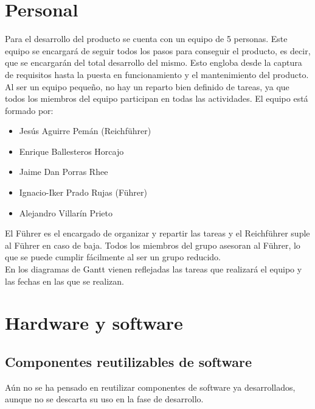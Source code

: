 \documentclass[spanish,a4paper,12pt]{report}	%
\begin{document}
	\section{Personal}
		Para el desarrollo del producto se cuenta con un equipo de 5 personas. Este
		equipo se encargará de seguir todos los pasos para conseguir el producto, es
		decir, que se encargarán del total desarrollo del mismo. Esto engloba desde la
		captura de requisitos hasta la puesta en funcionamiento y el mantenimiento del
		producto.\\
		Al ser un equipo pequeño, no hay un reparto bien definido de tareas, ya que todos
		los miembros del equipo participan en todas las actividades. 
		El equipo está formado por: 
		\begin{itemize}
		  \item Jesús Aguirre Pemán (Reichführer)
		  \item Enrique Ballesteros Horcajo
		  \item Jaime Dan Porras Rhee
		  \item Ignacio-Iker Prado Rujas (Führer)
		  \item Alejandro Villarín Prieto
		\end{itemize}
		El Führer es el encargado de organizar y repartir las tareas y el Reichführer suple al Führer en caso de baja.
		Todos los miembros del grupo asesoran al Führer, lo que se puede cumplir fácilmente al ser un grupo reducido.\\
		En los diagramas de Gantt vienen reflejadas las tareas que realizará el equipo y las fechas en las que se realizan.
		
	\section{Hardware y software}

		\subsection{Componentes reutilizables de software}
			Aún no se ha pensado en reutilizar componentes de software ya desarrollados, aunque no se descarta su uso
			en la fase de desarrollo.
\end{document}
